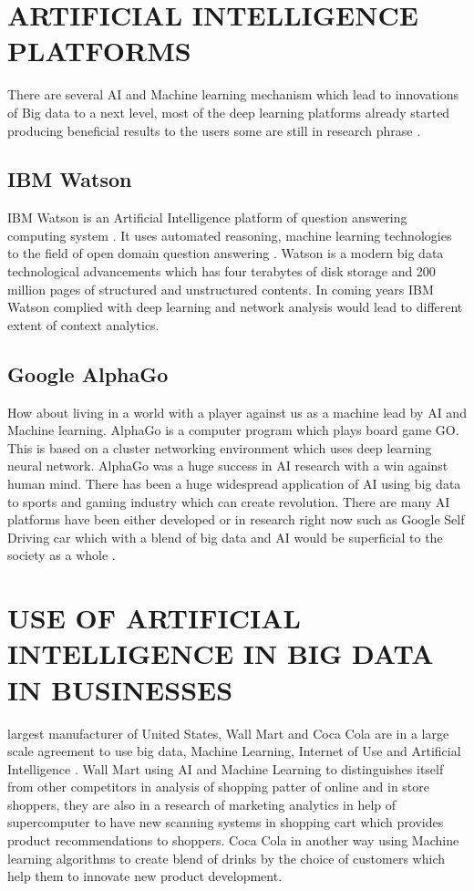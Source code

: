\documentclass[sigconf]{acmart}
\begin{document}
\section{ARTIFICIAL INTELLIGENCE PLATFORMS}
There are several AI and Machine learning mechanism which lead to innovations of Big data to a next level, most of the deep learning platforms already started producing beneficial results to the users some are still in research phrase \cite{editor03}.

\subsection{IBM Watson}
IBM Watson is an Artificial Intelligence platform of question answering computing system \cite{editor04}.  It uses automated reasoning, machine learning technologies to the field of open domain question answering \cite{editor04}. Watson is a modern big data technological advancements which has four terabytes of disk storage and 200 million pages of structured and unstructured contents. In coming years IBM Watson complied with deep learning and network analysis would lead to different extent of context analytics.

\subsection{Google AlphaGo}
How about living in a world with a player against us as a machine lead by AI and Machine learning. AlphaGo is a computer program which plays board game GO. This is based on a cluster networking environment which uses deep learning neural network. AlphaGo was a huge success in AI research with a win against human mind. There has been a huge widespread application of AI using big data to sports and gaming industry which can create revolution. There are many AI platforms have been either developed or in research right now such as Google Self Driving car which with a blend of big data and AI would be superficial to the society as a whole \cite{editor04}.

\section{USE OF ARTIFICIAL INTELLIGENCE IN BIG DATA IN BUSINESSES }
largest manufacturer of United States, Wall Mart and Coca Cola are in a large scale agreement to use big data, Machine Learning, Internet of Use and Artificial Intelligence \cite{editor05}. Wall Mart using AI and Machine Learning to distinguishes itself from other competitors in analysis of shopping patter of online and in store shoppers, they are also in a research of marketing analytics in help of supercomputer to have new scanning systems in shopping cart which provides product recommendations to shoppers. Coca Cola in another way using Machine learning algorithms to create blend of drinks by the choice of customers which help them to innovate new product development. 
\end{document}
